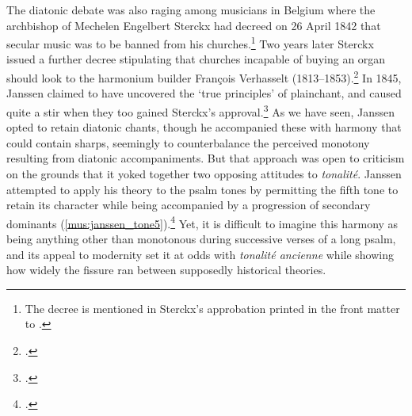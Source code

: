 The diatonic debate was also raging among musicians in Belgium where the archbishop of Mechelen Engelbert Sterckx had decreed on 26 April 1842 that secular music was to be banned from his churches.\footnote{The decree is mentioned in Sterckx's approbation printed in the front matter to \cite{HenryNovumorganumRecueil1844}.}
Two years later Sterckx issued a further decree stipulating that churches incapable of buying an organ should look to the harmonium builder François Verhasselt (1813--1853).\footnote{\covid{}\cite[439--41]{HaineDictionnairefacteursinstruments1986}.}
In 1845, Janssen claimed to have uncovered the `true principles' of plainchant, and caused quite a stir when they too gained Sterckx's approval.\footcite[Danjou to Fétis, 6 April 1845, in][196]{FetisCorrespondance2006}
As we have seen, Janssen opted to retain diatonic chants, though he accompanied these with harmony that could contain sharps, seemingly to counterbalance the perceived monotony resulting from diatonic accompaniments.
But that approach was open to criticism on the grounds that it yoked together two opposing attitudes to \emph{tonalité}.
Janssen attempted to apply his theory to the psalm tones by permitting the fifth tone to retain its character while being accompanied by a progression of secondary dominants (\cref{mus:janssen_tone5}).\footcite[220]{Janssenvraisprincipeschant1845}
Yet, it is difficult to imagine this harmony as being anything other than monotonous during successive verses of a long psalm, and its appeal to modernity set it at odds with \emph{tonalité ancienne} while showing how widely the fissure ran between supposedly historical theories.
\nowidow[2]

